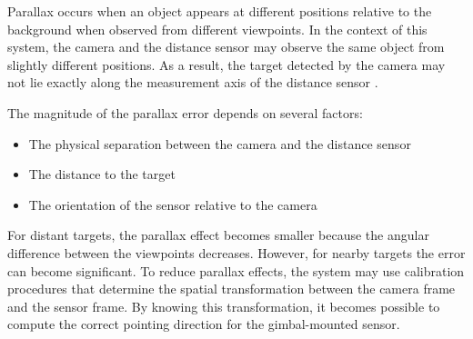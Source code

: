 Parallax occurs when an object appears at different positions relative to the background
when observed from different viewpoints. In the context of this system, the camera and
the distance sensor may observe the same object from slightly different positions. As a
result, the target detected by the camera may not lie exactly along the measurement axis
of the distance sensor \cite{parallax2}.

The magnitude of the parallax error depends on several factors:

\begin{itemize}
  \item The physical separation between the camera and the distance sensor
  \item The distance to the target
  \item The orientation of the sensor relative to the camera
\end{itemize}

For distant targets, the parallax effect becomes smaller because the angular difference
between the viewpoints decreases. However, for nearby targets the error can become significant.
To reduce parallax effects, the system may use calibration procedures that determine the
spatial transformation between the camera frame and the sensor frame. By knowing this
transformation, it becomes possible to compute the correct pointing direction for the
gimbal-mounted sensor.
